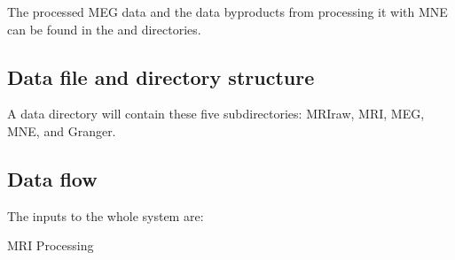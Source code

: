 \documentclass[11pt]{article}
\begin{document}
The processed MEG data and the data byproducts from processing it with
MNE can be found in the  and  directories.

\subsection{Data file and directory structure}

A data directory will contain these five subdirectories: MRIraw, MRI,
MEG, MNE, and Granger.


\subsection{Data flow}

The inputs to the whole system are:

\newcommand{\dataflow}[3]{\item #1\par\textbf{Data In:~}#2\par%
  \textbf{Data Out:~}#3\par}

MRI Processing
\end{document}
